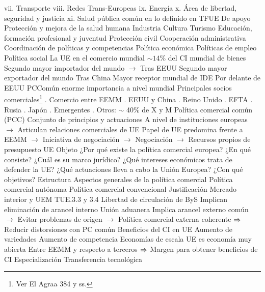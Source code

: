 \documentclass{nuevotema}
\begin{document}
\begin{esquemal}
				\4[] vii. Transporte
				\4[] viii. Redes Trans-Europeas
				\4[] ix. Energía
				\4[] x. Área de libertad, seguridad y justicia
				\4[] xi. Salud pública común en lo definido en TFUE
				\4 De apoyo
				\4[] Protección y mejora de la salud humana
				\4[] Industria
				\4[] Cultura
				\4[] Turismo
				\4[] Educación, formación profesional y juventud
				\4[] Protección civil
				\4[] Cooperación administrativa
				\4 Coordinación de políticas y competencias
				\4[] Política económica
				\4[] Políticas de empleo
				\4[] Política social
			\3 La UE en el comercio mundial
				\4 $\sim 14\%$ del CI mundial de bienes
				\4 Segundo mayor importador del mundo
				\4[] $\to$ Tras EEUU
				\4 Segundo mayor exportador del mundo
				\4[] Tras China
				\4 Mayor receptor mundial de IDE
				\4[] Por delante de EEUU
				\4[$\then$] PCComún enorme importancia a nivel mundial
				\4 Principales socios comerciales\footnote{Ver El Agraa 384 y ss.}
				. Comercio entre EEMM
				. EEUU y China
				. Reino Unido
				. EFTA
				. Rusia
				. Japón
				. Emergentes
				. Otros: $\sim$ 40\% de X y M
			\3 Política comercial común (PCC)
				\4 Conjunto de principios y actuaciones
				\4[] A nivel de instituciones europeas
				\4[] $\to$ Articulan relaciones comerciales de UE
				\4 Papel de UE predomina frente a EEMM
				\4[] $\to$ Iniciativa de negociación
				\4[] $\to$ Negociación
				\4[] $\to$ Recursos propios de presupuesto UE
		\2 Objeto
			\3 ¿Por qué existe la política comercial europea?
			\3 ¿En qué consiste?
			\3 ¿Cuál es su marco jurídico?
			\3 ¿Qué intereses económicos trata de defender la UE?
			\3 ¿Qué actuaciones lleva a cabo la Unión Europea?
			\3 ¿Con qué objetivos?
		\2 Estructura
			\3 Aspectos generales de la política comercial
			\3 Política comercial autónoma
			\3 Política comercial convencional
	\1 
		\2 Justificación
			\3 Mercado interior y UEM
				\4 TUE.3.3 y 3.4
				\4 Libertad de circulación de ByS
				\4[] Implican eliminación de arancel interno
				\4 Unión aduanera
				\4[] Implica arancel externo común
				\4[] $\to$ Evitar problemas de origen
				\4[] $\to$ Política comercial externa coherente
				\4[] $\then$ Reducir distorsiones con PC común
			\3 Beneficios del CI en UE
				\4 Aumento de variedades
				\4 Aumento de competencia
				\4 Economías de escala
				\4[$\to$] UE es economía muy abierta
				\4[] Entre EEMM y respecto a terceros
				\4[] $\then$ Margen para obtener beneficios de CI
				\4 Especialización
				\4 Transferencia tecnológica

\end{esquemal}
\end{document}
